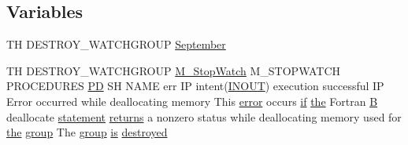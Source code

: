 \subsection*{Variables}
\begin{DoxyCompactItemize}
\item 
TH D\+E\+S\+T\+R\+O\+Y\+\_\+\+W\+A\+T\+C\+H\+G\+R\+O\+UP \hyperlink{destroy__watchgroup_83_8txt_a9282988e24ecf276c933cacbd14ff53b}{September}
\item 
TH D\+E\+S\+T\+R\+O\+Y\+\_\+\+W\+A\+T\+C\+H\+G\+R\+O\+UP \hyperlink{option__stopwatch_83_8txt_aa2011fc45a5e502e87ee50996a8a9305}{M\+\_\+\+Stop\+Watch} M\+\_\+\+S\+T\+O\+P\+W\+A\+T\+CH P\+R\+O\+C\+E\+D\+U\+R\+ES \hyperlink{what__overview_81_8txt_a85f26da5a4481fbdb0d9c79f2b94de3e}{PD} SH N\+A\+ME err IP intent(\hyperlink{M__stopwatch_83_8txt_aac11c70dd588f9c3fe71e95dbe89902f}{I\+N\+O\+UT}) execution successful IP Error occurred while deallocating memory This \hyperlink{M__stopwatch_83_8txt_ac4611edff506351be87ddb9adfc62315}{error} occurs \hyperlink{exit_87_8txt_a77395982f8d25581c808c40f3b634d90}{if} \hyperlink{M__stopwatch_83_8txt_a0f266597de2e57eb3aa964927bb30e14}{the} Fortran \hyperlink{intro__blas1_83_8txt_a5f157716d3fd55e7b7e08312dc859b58}{B} deallocate \hyperlink{M__stopwatch_83_8txt_a43758526aa61bbaa49faf1e287658350}{statement} \hyperlink{M__stopwatch_83_8txt_aee54cdd5349bf498aa96e7f9426a0717}{returns} a nonzero status while deallocating memory used for \hyperlink{M__stopwatch_83_8txt_a0f266597de2e57eb3aa964927bb30e14}{the} \hyperlink{M__stopwatch_83_8txt_a80fa32a76a22835e3c85462b2803875c}{group} The \hyperlink{M__stopwatch_83_8txt_a80fa32a76a22835e3c85462b2803875c}{group} \hyperlink{intro__blas1_83_8txt_a42a91df93f840595de3019ceb5d1df23}{is} \hyperlink{destroy__watchgroup_83_8txt_aa8895bfb33bae6c686314ee89dc98fa2}{destroyed}
\item 

\end{DoxyCompactItemize}
